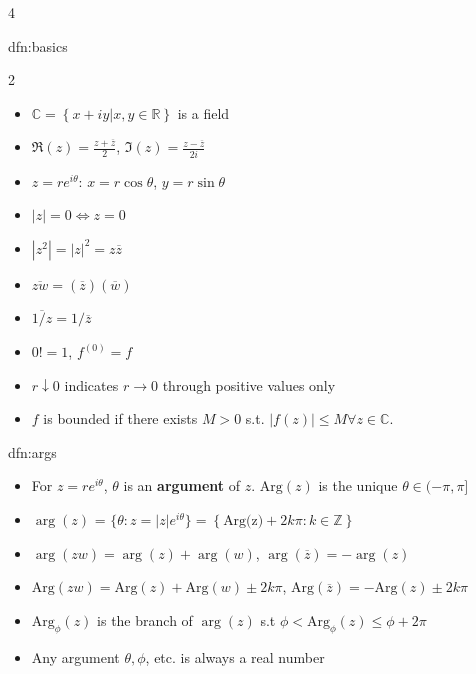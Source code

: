 \documentclass[landscape, 8pt]{extarticle}
\begin{document}
\begin{multicols*}{4}
		
		\begin{dfn}[Basics]{dfn:basics}{ }
			\vspace{-5pt}
			\begin{multicols}{2}
				\begin{itemize}
					\item $\mathbb{C} = \left\{x + iy | x, y \in \mathbb{R}\right\}$ is a field
					\item $\Re(z) = \frac{z + \overline{z}}{2}$, $\Im(z) = \frac{z - \overline{z}}{2 i}$
					\item $z = re^{i\theta}$: $x = r \cos\theta$, $y = r \sin\theta$
					\item $\left|z\right| = 0 \iff z = 0$
					\item $\left|z^2\right| = \left|z\right|^2 = z \overline{z}$
					\item $\overline{zw} = (\overline{z}) (\overline{w})$
					\item $\overline{1/z} = 1/\overline{z}$
					\item $0! = 1$, $f^{(0)} = f$
					\item $r \downarrow 0$ indicates $r \to 0$ through positive values only
				\end{itemize}
				
			\end{multicols}
			\vspace{-8pt}
			\begin{itemize}
				\item $f$ is bounded if there exists $M > 0$ s.t. $\left|f(z)\right| \le M \forall z \in \mathbb{C}$.
			\end{itemize}
		
		\end{dfn}
		
		
		\begin{dfn}{dfn:args}{ }
			\begin{itemize}
				\item For $z = re^{i\theta}$, $\theta$ is an \textbf{argument} of $z$. $\text{Arg}(z)$ is the unique $\theta \in (-\pi, \pi]$
				\item $\arg(z)$ = $\{\theta : z = \left|z\right| e^{i\theta}\} = \left\{ \text{Arg(z)} + 2k\pi : k \in \mathbb{Z}\right\}$
				\item $\arg(zw)  = \arg(z) + \arg(w)$, $\arg(\overline{z}) = -\arg(z)$
				\item $\text{Arg}(zw) = \text{Arg}(z) + \text{Arg}(w) \pm 2k \pi$, $\text{Arg}(\overline{z}) = -\text{Arg}(z) \pm 2k \pi$
				\item $\text{Arg}_\phi(z)$ is the branch of $\arg(z)$ s.t $\phi < \text{Arg}_\phi(z) \le \phi + 2\pi$
				\item Any argument $\theta, \phi$, etc. is always a real number
			\end{itemize}
			

\end{dfn}
\end{multicols*}
\end{document}
